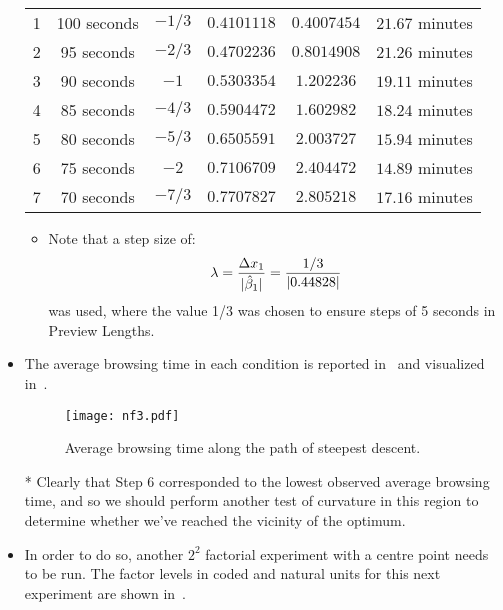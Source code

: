 \begin{itemize}
\begin{table}[!htbp]
\begin{tabular}{cccccc}
                  1             & 100 seconds    & $-1 / 3$ & $0.4101118$  & $0.4007454$ & $21.67$ minutes       \\
                  2             & 95 seconds     & $-2 / 3$ & $0.4702236$  & $0.8014908$ & $21.26$ minutes       \\
                  3             & 90 seconds     & $-1$     & $0.5303354$  & $1.202236$  & $19.11$ minutes       \\
                  4             & 85 seconds     & $-4 / 3$ & $0.5904472$  & $1.602982$  & $18.24$ minutes       \\
                  5             & 80 seconds     & $-5 / 3$ & $0.6505591$  & $2.003727$  & $15.94$ minutes       \\
                  6             & 75 seconds     & $-2$     & $0.7106709$  & $2.404472$  & $14.89$ minutes       \\
                  7             & 70 seconds     & $-7 / 3$ & $0.7707827$  & $2.805218$  & $17.16$ minutes       \\
                  \bottomrule
              \end{tabular}
          \end{table}
          \begin{itemize}
              \item Note that a step size of:
                    \[ \lambda=\frac{\Delta x_1}{\lvert\hat{\beta}_1\rvert}=\frac{1/3}{\lvert0.44828\rvert}  \]
                    was used, where the value 1/3 was chosen to ensure steps of 5 seconds in Preview Lengths.
          \end{itemize}
    \item The average browsing time in each condition is reported in~ and visualized in~.
          \begin{figure}[!htbp]
              \centering
              \texttt{[image: nf3.pdf]}
              \caption{Average browsing time along the path of steepest descent.}\label{fig:nf3}
          \end{figure}
    \item[*] Clearly that Step 6 corresponded to the lowest observed average browsing time, and so we should
        perform another test of curvature in this region to determine whether we've reached the vicinity of the
        optimum.
    \item In order to do so, another $2^2$ factorial experiment with a centre point needs to be run. The factor
          levels in coded and natural units for this next experiment are shown in~.

\end{itemize}
